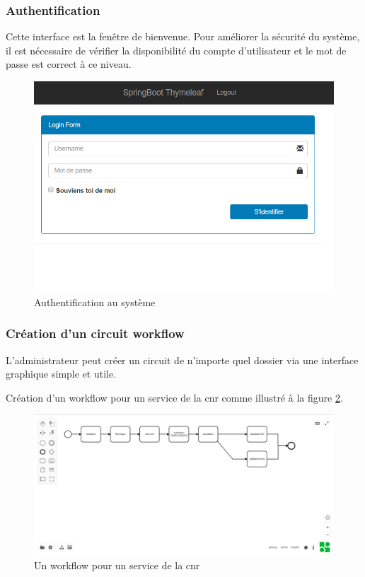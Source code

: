   \subsubsection{Authentification}
Cette interface est la fenêtre de bienvenue.
Pour améliorer la sécurité du système, il est nécessaire de vérifier la disponibilité du compte d'utilisateur et le mot de passe est correct à ce niveau.
 \begin{figure}[H]
 	\centering
 	\includegraphics[width=1\linewidth]{images/captures/capturesadmin/login}
 	\caption{Authentification au système }
 	\label{fig:login}
 \end{figure}
  
  
  
  
 \subsubsection{Création d'un circuit workflow}
L'administrateur peut créer un circuit de n'importe quel dossier via une interface graphique simple et utile.
\begin{exmp}
 Création d'un workflow pour un service de la \ac{cnr} comme illustré à la figure \ref{fig:bpmn}. 
\end{exmp}
 
\begin{figure}[H]
	\centering
	\includegraphics[width=1\linewidth]{images/captures/capturesadmin/bpmn}
	\caption{Un workflow pour un service de la \ac{cnr}}
	\label{fig:bpmn}
\end{figure}
  
